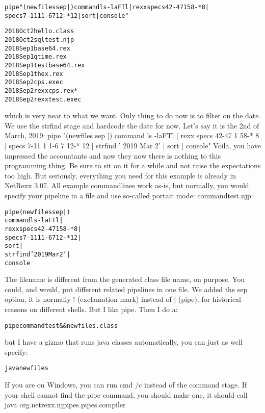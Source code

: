 \begin{alltt}
pipe "(newfiles sep |) command ls -laFTl | rexx specs 42-47 1 58-* 8 |
specs 7-11 1 1-6 7 12-* 12 | sort | console"
\end{alltt}
\begin{alltt}
2018 Oct 2 hello.class
2018 Oct 2 sqltest.njp
2018 Sep 1 base64.rex
2018 Sep 1 qtime.rex
2018 Sep 1 testbase64.rex
2018 Sep 1 thex.rex
2018 Sep 2 cps.exec
2018 Sep 2 rexxcps.rex*
2018 Sep 2 rexxtest.exec
\end{alltt}
which is very near to what we want. Only thing to do now is to filter on the date. We use the strfind stage and hardcode the date for now. Let's say it is the 2nd of March, 2019:
pipe "(newfiles sep |) command ls -laFTl | rexx specs 42-47 1 58-* 8 |  specs 7-11 1 1-6 7 12-* 12 | strfind ' 2019 Mar 2' | sort | console"
Voila, you have impressed the accountants and now they now there is nothing to this programming thing. Be sure to sit on it for a while and not raise the expectations too high.
But seriously, everything you need for this example is already in NetRexx 3.07. All example commandlines work as-is,  but normally, you would specify your pipeline in a file and use so-called portait mode:
commandtest.njp:
\begin{alltt}
pipe (newfiles sep |)
command ls -laFTl |
rexx specs 42-47 1 58-* 8 |
specs 7-11 1 1-6 7 12-* 12 |
sort |
strfind ' 2019 Mar 2' |
console
\end{alltt}
The filename is different from the generated class file name, on purpose. You could, and would, put different related pipelines in one file.
We added the sep option, it is normally ! (exclamation mark) instead of | (pipe), for historical reasons on different shells. But I like pipe.
Then I do a:
\begin{alltt}
pipe commandtest && newfiles.class
\end{alltt}
but I have a gizmo that runs java classes automatically, you can just as well specify:

\begin{alltt}
java newfiles
\end{alltt}
If you are on Windows, you can run cmd /c instead of the command stage. If your shell cannot find the pipe command, you should make one, it should call 
java org.netrexx.njpipes.pipes.compiler

